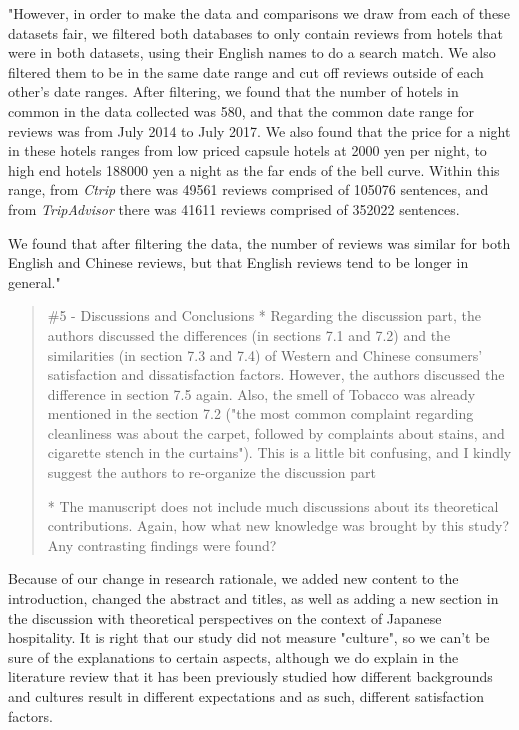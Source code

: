 \documentclass{letter}
\begin{document}
"However, in order to make the data and comparisons we draw from each of these datasets fair, we filtered both databases to only contain reviews from hotels that were in both datasets, using their English names to do a search match. We also filtered them to be in the same date range and cut off reviews outside of each other's date ranges. After filtering, we found that the number of hotels in common in the data collected was \num[group-separator={,}]{580}, and that the common date range for reviews was from July 2014 to July 2017. We also found that the price for a night in these hotels ranges from low priced capsule hotels at 2000 yen per night, to high end hotels \num[group-separator={,}]{188000} yen a night as the far ends of the bell curve. Within this range, from \textit{Ctrip} there was \num[group-separator={,}]{49561} reviews comprised of \num[group-separator={,}]{105076} sentences, and from \textit{TripAdvisor} there was \num[group-separator={,}]{41611} reviews comprised of \num[group-separator={,}]{352022} sentences.

We found that after filtering the data, the number of reviews was similar for both English and Chinese reviews, but that English reviews tend to be longer in general."



\begin{quotation}
\#5 - Discussions and Conclusions
*  Regarding the discussion part, the authors discussed the differences (in sections 7.1 and 7.2) and the similarities (in section 7.3 and 7.4) of Western and Chinese consumers' satisfaction and dissatisfaction factors.  However, the authors discussed the difference in section 7.5 again. Also, the smell of Tobacco was already mentioned in the section 7.2 ("the most common complaint regarding cleanliness was about the carpet, followed by complaints about stains, and cigarette stench in the curtains"). This is a little bit confusing, and I kindly suggest the authors to re-organize the discussion part

*  The manuscript does not include much discussions about its theoretical contributions. Again, how what new knowledge was brought by this study? Any contrasting findings were found?
\end{quotation}

Because of our change in research rationale, we added new content to the introduction, changed the abstract and titles, as well as adding a new section in the discussion with theoretical perspectives on the context of Japanese hospitality. It is right that our study did not measure "culture", so we can't be sure of the explanations to certain aspects, although we do explain in the literature review that it has been previously studied how different backgrounds and cultures result in different expectations and as such, different satisfaction factors. 
\end{document}
